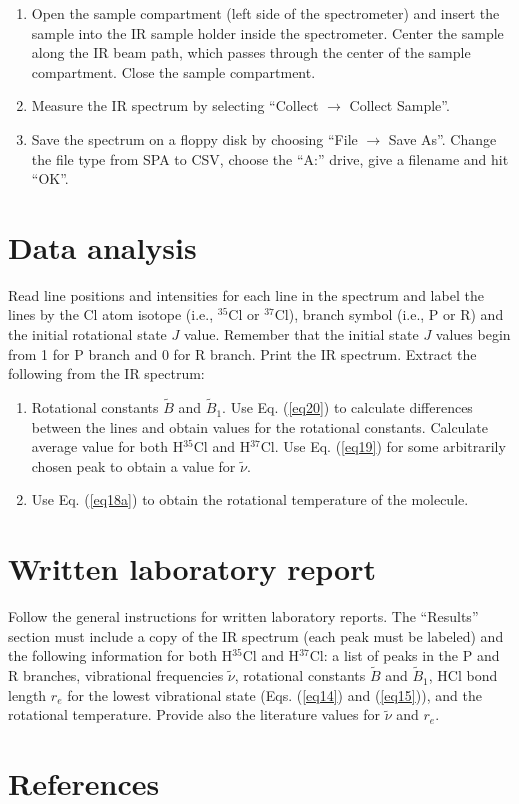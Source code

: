 \documentclass[byrevtex,amssymb,aps,pra,floatfix,letterpaper]{revtex4}
\begin{document}
\begin{enumerate}
\item Open the sample compartment (left side of the spectrometer) and insert the sample into the IR sample holder inside the spectrometer. Center the sample along the IR beam path, which passes through the center of the sample compartment. Close the sample compartment.

\item Measure the IR spectrum by selecting ``Collect $\rightarrow$ Collect Sample''.

\item Save the spectrum on a floppy disk by choosing ``File $\rightarrow$ Save As''. Change the file type from SPA to CSV, choose the ``A:'' drive, give a filename and hit ``OK''.

\end{enumerate}

\section{Data analysis}

Read line positions and intensities for each line in the spectrum and label the lines by the Cl atom isotope (i.e., $^{35}$Cl or $^{37}$Cl), branch symbol (i.e., P or R) and the initial rotational state $J$ value. Remember that the initial state $J$ values begin from 1 for P branch and 0 for R branch. Print the IR spectrum. Extract the following from the IR spectrum:

\begin{enumerate}

\item Rotational constants $\tilde{B}$ and $\tilde{B}_1$. Use Eq. (\ref{eq20}) to calculate differences between the lines and obtain values for the rotational constants. Calculate average value for both H$^{35}$Cl and H$^{37}$Cl. Use Eq. (\ref{eq19}) for some arbitrarily chosen peak to obtain a value for $\tilde{\nu}$.

\item Use Eq. (\ref{eq18a}) to obtain the rotational temperature of the molecule.

\end{enumerate}

\section{Written laboratory report}

Follow the general instructions for written laboratory reports. The ``Results'' section must include a copy of the IR spectrum (each peak must be labeled) and the following information for both H$^{35}$Cl and H$^{37}$Cl: a list of peaks in the P and R branches, vibrational frequencies $\tilde{\nu}$, rotational constants $\tilde{B}$ and $\tilde{B}_1$, HCl bond length $r_e$ for the lowest vibrational state (Eqs. (\ref{eq14}) and (\ref{eq15})), and the rotational temperature. Provide also the literature values for $\tilde{\nu}$ and $r_e$.

\section{References}


\end{document}
